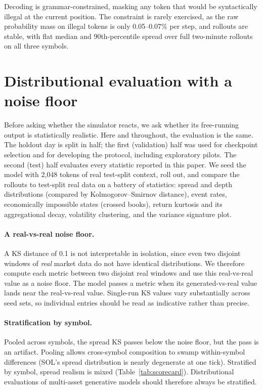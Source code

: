 \documentclass[11pt]{article}
\begin{document}
Decoding is grammar-constrained, masking any token that would be syntactically illegal at the current position. The constraint is rarely exercised, as the raw probability mass on illegal tokens is only 0.05--0.07\% per step, and rollouts are stable, with flat median and 90th-percentile spread over full two-minute rollouts on all three symbols.

\section{Distributional evaluation with a noise floor}
\label{sec:distributional}

Before asking whether the simulator reacts, we ask whether its free-running output is statistically realistic. Here and throughout, the evaluation is the same. The holdout day is split in half; the first (validation) half was used for checkpoint selection and for developing the protocol, including exploratory pilots. The second (test) half evaluates every statistic reported in this paper. We seed the model with 2,048 tokens of real test-split context, roll out, and compare the rollouts to test-split real data on a battery of statistics: spread and depth distributions (compared by Kolmogorov--Smirnov distance), event rates, economically impossible states (crossed books), return kurtosis and its aggregational decay, volatility clustering, and the variance signature plot.

\paragraph{A real-vs-real noise floor.} A KS distance of 0.1 is not interpretable in isolation, since even two disjoint windows of \emph{real} market data do not have identical distributions. We therefore compute each metric between two disjoint real windows and use this real-vs-real value as a noise floor. The model passes a metric when its generated-vs-real value lands near the real-vs-real value. Single-run KS values vary substantially across seed sets, so individual entries should be read as indicative rather than precise.

\paragraph{Stratification by symbol.} Pooled across symbols, the spread KS passes below the noise floor, but the pass is an artifact. Pooling allows cross-symbol composition to swamp within-symbol differences (SOL's spread distribution is nearly degenerate at one tick). Stratified by symbol, spread realism is mixed (Table~\ref{tab:scorecard}). Distributional evaluations of multi-asset generative models should therefore always be stratified.
\end{document}
